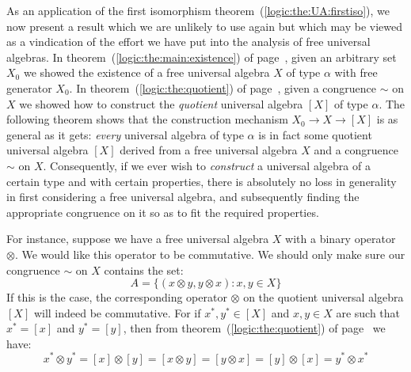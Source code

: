 As an application of the first isomorphism
theorem~(\ref{logic:the:UA:firstiso}),  we now present a result
which we are unlikely to use again but which may be viewed as a
vindication of the effort we have put into the analysis of free
universal algebras. In theorem~(\ref{logic:the:main:existence}) of
page~\pageref{logic:the:main:existence}, given an arbitrary set
$X_{0}$ we showed the existence of a free universal algebra $X$ of
type $\alpha$ with free generator $X_{0}$. In
theorem~(\ref{logic:the:quotient}) of
page~\pageref{logic:the:quotient}, given a congruence $\sim$ on $X$
we showed how to construct the {\em quotient} universal algebra
$[X]$ of type $\alpha$. The following theorem shows that the
construction mechanism $X_{0}\to X\to [X]$ is as general as it gets:
{\em every} universal algebra of type $\alpha$ is in fact some
quotient universal algebra $[X]$ derived from a free universal
algebra $X$ and a congruence $\sim$ on $X$. Consequently, if we ever
wish to {\em construct} a universal algebra of a certain type and
with certain properties, there is absolutely no loss in generality
in first considering a free universal algebra, and subsequently
finding the appropriate congruence on it so as to fit the required
properties.

For instance, suppose we have a free universal algebra $X$ with a
binary operator $\otimes$. We would like this operator to be
commutative. We should only make sure our congruence $\sim$ on $X$
contains the set:
    \[
    A=\{(x\otimes y,y\otimes x):x,y\in X\}
    \]
If this is the case, the corresponding operator $\otimes$ on the
quotient universal algebra $[X]$ will indeed be commutative. For if
$x^{*},y^{*}\in [X]$ and $x,y\in X$ are such that $x^{*}=[x]$ and
$y^{*}=[y]$, then from theorem~(\ref{logic:the:quotient}) of
page~\pageref{logic:the:quotient} we have:
    \[
    x^{*}\otimes y^{*}=[x]\otimes [y]=[x\otimes y]=[y\otimes
    x]=[y]\otimes[x]=y^{*}\otimes x^{*}
    \]

